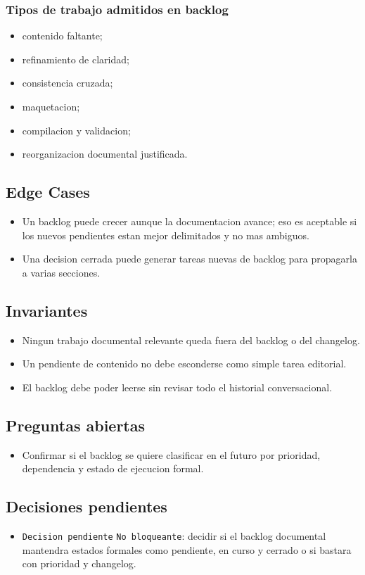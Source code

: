 \subsubsection{Tipos de trabajo admitidos en backlog}

\begin{itemize}
  \item contenido faltante;
  \item refinamiento de claridad;
  \item consistencia cruzada;
  \item maquetacion;
  \item compilacion y validacion;
  \item reorganizacion documental justificada.
\end{itemize}

\subsection{Edge Cases}

\begin{itemize}
  \item Un backlog puede crecer aunque la documentacion avance; eso es aceptable si los nuevos pendientes estan mejor delimitados y no mas ambiguos.
  \item Una decision cerrada puede generar tareas nuevas de backlog para propagarla a varias secciones.
\end{itemize}

\subsection{Invariantes}

\begin{itemize}
  \item Ningun trabajo documental relevante queda fuera del backlog o del changelog.
  \item Un pendiente de contenido no debe esconderse como simple tarea editorial.
  \item El backlog debe poder leerse sin revisar todo el historial conversacional.
\end{itemize}

\subsection{Preguntas abiertas}

\begin{itemize}
  \item Confirmar si el backlog se quiere clasificar en el futuro por prioridad, dependencia y estado de ejecucion formal.
\end{itemize}

\subsection{Decisiones pendientes}

\begin{itemize}
  \item \texttt{Decision pendiente} \texttt{No bloqueante}: decidir si el backlog documental mantendra estados formales como pendiente, en curso y cerrado o si bastara con prioridad y changelog.
\end{itemize}
